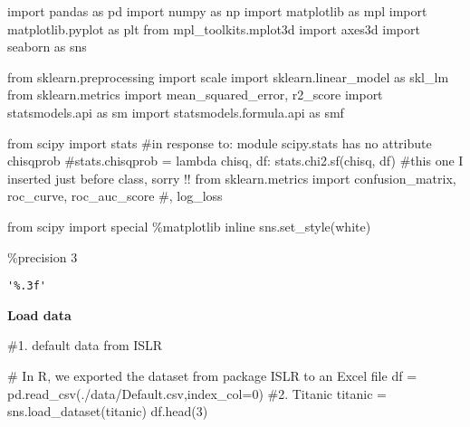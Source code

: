 \documentclass[
  letterpaper,
  DIV=11,
  numbers=noendperiod]{scrreprt}
\newenvironment{Shaded}{\begin{snugshade}}{\end{snugshade}}
\newcommand{\CommentTok}[1]{\textcolor[rgb]{0.37,0.37,0.37}{#1}}
\newcommand{\DecValTok}[1]{\textcolor[rgb]{0.68,0.00,0.00}{#1}}
\newcommand{\ImportTok}[1]{\textcolor[rgb]{0.00,0.46,0.62}{#1}}
\newcommand{\NormalTok}[1]{\textcolor[rgb]{0.00,0.23,0.31}{#1}}
\newcommand{\OperatorTok}[1]{\textcolor[rgb]{0.37,0.37,0.37}{#1}}
\newcommand{\StringTok}[1]{\textcolor[rgb]{0.13,0.47,0.30}{#1}}
\begin{document}
\begin{Shaded}
\begin{Highlighting}[]
\ImportTok{import}\NormalTok{ pandas }\ImportTok{as}\NormalTok{ pd}
\ImportTok{import}\NormalTok{ numpy }\ImportTok{as}\NormalTok{ np}
\ImportTok{import}\NormalTok{ matplotlib }\ImportTok{as}\NormalTok{ mpl}
\ImportTok{import}\NormalTok{ matplotlib.pyplot }\ImportTok{as}\NormalTok{ plt}
\ImportTok{from}\NormalTok{ mpl\_toolkits.mplot3d }\ImportTok{import}\NormalTok{ axes3d}
\ImportTok{import}\NormalTok{ seaborn }\ImportTok{as}\NormalTok{ sns}

\ImportTok{from}\NormalTok{ sklearn.preprocessing }\ImportTok{import}\NormalTok{ scale}
\ImportTok{import}\NormalTok{ sklearn.linear\_model }\ImportTok{as}\NormalTok{ skl\_lm}
\ImportTok{from}\NormalTok{ sklearn.metrics }\ImportTok{import}\NormalTok{ mean\_squared\_error, r2\_score}
\ImportTok{import}\NormalTok{ statsmodels.api }\ImportTok{as}\NormalTok{ sm}
\ImportTok{import}\NormalTok{ statsmodels.formula.api }\ImportTok{as}\NormalTok{ smf}

\ImportTok{from}\NormalTok{ scipy }\ImportTok{import}\NormalTok{ stats}
\CommentTok{\#in response to: module \textquotesingle{}scipy.stats\textquotesingle{} has no attribute \textquotesingle{}chisqprob\textquotesingle{} }
\CommentTok{\#stats.chisqprob = lambda chisq, df: stats.chi2.sf(chisq, df)}
\CommentTok{\#this one I inserted just before class, sorry !!}
\ImportTok{from}\NormalTok{ sklearn.metrics }\ImportTok{import}\NormalTok{ confusion\_matrix, roc\_curve, roc\_auc\_score }\CommentTok{\#, log\_loss}

\ImportTok{from}\NormalTok{ scipy }\ImportTok{import}\NormalTok{ special}
\OperatorTok{\%}\NormalTok{matplotlib inline}
\NormalTok{sns.set\_style(}\StringTok{\textquotesingle{}white\textquotesingle{}}\NormalTok{)}

\OperatorTok{\%}\NormalTok{precision }\DecValTok{3}
\end{Highlighting}
\end{Shaded}

\begin{verbatim}
'%.3f'
\end{verbatim}

\textbf{Load data}

\begin{Shaded}
\begin{Highlighting}[]
\CommentTok{\#1. default data from ISLR}

\CommentTok{\# In R, we exported the dataset from package \textquotesingle{}ISLR\textquotesingle{} to an Excel file}
\NormalTok{df }\OperatorTok{=}\NormalTok{ pd.read\_csv(}\StringTok{\textquotesingle{}./data/Default.csv\textquotesingle{}}\NormalTok{,index\_col}\OperatorTok{=}\DecValTok{0}\NormalTok{)}
\CommentTok{\#2. Titanic}
\NormalTok{titanic }\OperatorTok{=}\NormalTok{ sns.load\_dataset(}\StringTok{\textquotesingle{}titanic\textquotesingle{}}\NormalTok{)}
\NormalTok{df.head(}\DecValTok{3}\NormalTok{)}
\end{Highlighting}
\end{Shaded}
\end{document}
